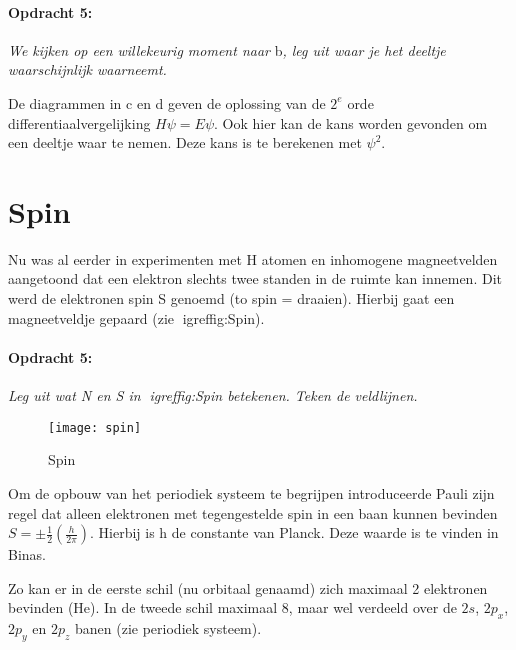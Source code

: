 \paragraph*{Opdracht 5:}

\emph{We kijken op een willekeurig moment naar }b\emph{,
leg uit waar je het deeltje waarschijnlijk waarneemt.}

De diagrammen in c en d
geven de oplossing van de $2^{e}$ orde differentiaalvergelijking
$H\psi=E\psi$. Ook hier kan de kans worden gevonden om een deeltje
waar te nemen. Deze kans is te berekenen met $\psi^{2}$.


\section{Spin}

Nu was al eerder in experimenten met H atomen en inhomogene magneetvelden
aangetoond dat een elektron slechts twee standen in de ruimte kan
innemen. Dit werd de elektronen spin S genoemd (to spin = draaien).
Hierbij gaat een magneetveldje gepaard (zie igref{fig:Spin}).


\paragraph*{Opdracht 5:}

\emph{Leg uit wat N en S in igref{fig:Spin} betekenen. Teken
de veldlijnen.}

\begin{figure}[h]
\noindent \begin{centering}
\texttt{[image: spin]}
\par\end{centering}

\caption{\label{fig:Spin}Spin}
\end{figure}


Om de opbouw van het periodiek systeem te begrijpen introduceerde
Pauli zijn regel dat alleen elektronen met tegengestelde spin in een
baan kunnen bevinden $S=\pm\frac{1}{2}(\frac{h}{2\pi})$. Hierbij
is h de constante van Planck. Deze waarde is te vinden in Binas.

Zo kan er in de eerste schil (nu orbitaal genaamd) zich maximaal 2
elektronen bevinden (He). In de tweede schil maximaal 8, maar wel
verdeeld over de $2s$, $2p_{x}$, $2p_{y}$ en $2p_{z}$ banen (zie
periodiek systeem).

